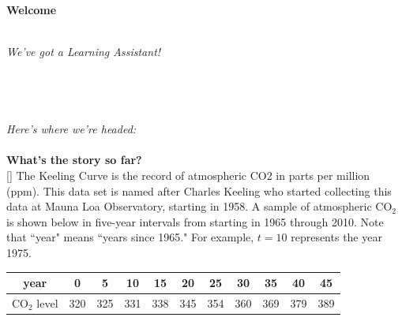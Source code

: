 \documentclass[10pt]{article}
\begin{document}
\pagestyle{otherpages}
\thispagestyle{firstpage}




{\bf\color{blue}Welcome }
 \\
 \\ 

 {\em We've got a Learning Assistant!} 
 ~\\\\\\\\\\
 {\em Here's where we're headed:}\\
 \\



\newpage
{\bf What's the story so far?}  \\
[]{
The Keeling Curve is the record of atmospheric CO2 in parts per million (ppm). This data set is named after Charles Keeling who started collecting this data at Mauna Loa Observatory, starting in 1958.  A sample of atmospheric CO$_2$ is shown below in five-year intervals from starting in 1965 through 2010.  Note that ``year" means ``years since 1965."  For example, $t=10$ represents the year 1975.
}{
}

\begin{center}
\begin{tabular}{|c|c|c|c|c|c|c|c|c|c|c|}
\hline
year & 0 & 5 & 10 & 15 & 20 & 25 & 30 & 35 & 40 & 45 \\
\hline
CO$_2$ level & 320 & 325 & 331 & 338 & 345 & 354 & 360 & 369 & 379 & 389 \\
\hline
\end{tabular}
\end{center}
\end{document}

